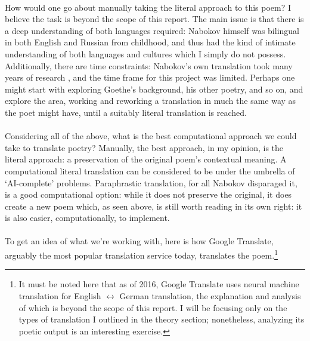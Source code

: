 \paragraph{}{How would one go about manually taking the literal
  approach to this poem? I believe the task is beyond the scope of
  this report. The main issue is that there is a deep understanding of
  both languages required: Nabokov himself was bilingual in both
  English and Russian from childhood, and thus had the kind of
  intimate understanding of both languages and cultures which I
  simply do not possess. Additionally, there are time constraints:
  Nabokov's own translation took many years of research
  \cite{nabokov}, and the time frame for this project was
  limited. Perhaps one might start with exploring Goethe's background,
  his other poetry, and so on, and explore the area, working and
  reworking a translation in much the same way as the poet might have,
  until a suitably literal translation is reached.}

\paragraph{}{Considering all of the above, what is the best
  computational approach we could take to translate poetry? Manually,
  the best approach, in my opinion, is the literal approach: a
  preservation of the original poem's contextual meaning. A
  computational literal translation can be considered to be under the
  umbrella of `AI-complete' problems. Paraphrastic translation, for
  all Nabokov disparaged it, is a good computational option: while it
  does not preserve the original, it does create a new poem which, as
  seen above, is still worth reading in its own right: it is also
  easier, computationally, to implement.}

\paragraph{}{To get an idea of what we're working with, here is how
  Google Translate, arguably the most popular translation service
  today, translates the poem.\footnote{It must be noted here that as
    of 2016, Google Translate uses neural machine translation for
    English $\leftrightarrow$ German translation, the explanation and
    analysis of which is beyond the scope of this report. I will be
    focusing only on the types of translation I outlined in the theory
    section; nonetheless, analyzing its poetic output is an
    interesting exercise. }\\}

